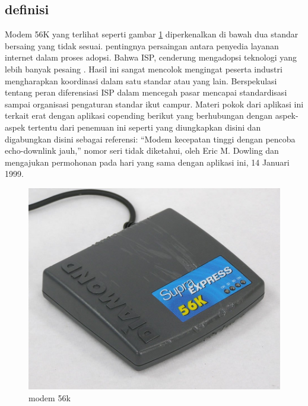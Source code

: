 \subsection{definisi}
Modem 56K yang terlihat seperti gambar \ref{modem56k} diperkenalkan di bawah dua standar bersaing yang tidak sesuai. pentingnya persaingan antara penyedia layanan internet dalam proses adopsi.
Bahwa ISP, cenderung mengadopsi teknologi yang lebih banyak pesaing . Hasil ini sangat mencolok mengingat peserta industri mengharapkan koordinasi dalam satu standar atau yang lain.
Berspekulasi tentang peran diferensiasi ISP dalam mencegah pasar mencapai standardisasi sampai organisasi pengaturan standar ikut campur.
Materi pokok dari aplikasi ini terkait erat dengan aplikasi copending berikut yang berhubungan dengan aspek-aspek tertentu dari penemuan ini seperti yang diungkapkan disini dan digabungkan disini sebagai referensi: ``Modem kecepatan tinggi dengan pencoba echo-downlink jauh,'' nomor seri tidak diketahui, oleh Eric M. Dowling dan mengajukan permohonan pada hari yang sama dengan aplikasi ini, 14 Januari 1999.
\begin{figure}[ht]
	\centerline{\includegraphics[width=1\textwidth]{figures/modem56k.jpg}}
	\caption{modem 56k}
	\label{modem56k}
	\end{figure}
	
